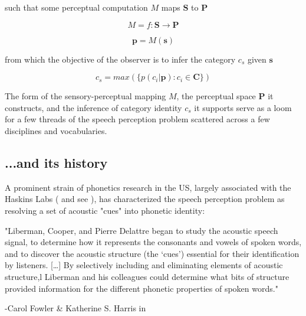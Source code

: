 \begin{multicols}{2}
such that some perceptual computation $M$ maps $\mathbf{S}$ to $\mathbf{P}$

\begin{equation}
\label{eqn:map}
M = f: \mathbf{S} \to \mathbf{P}
\end{equation} 

\begin{equation}
\label{eqn:pfroms}
\mathbf{p} = M(\mathbf{s})
\end{equation}

from which the objective of the observer is to infer the category $c_s$ given $\mathbf{s}$ 

\begin{equation}
\label{eqn:infer}
c_s = max( \{ p(c_i | \mathbf{p}) : c_i \in \mathbf{C} \})
\end{equation}

The form of the sensory-perceptual mapping $M$, the perceptual space $\mathbf{P}$ it constructs, and the inference of category identity $c_s$ it supports serve as a loom for a few threads of the speech perception problem scattered across a few disciplines and vocabularies.

\subsection{...and its history}


A prominent strain of phonetics research in the US, largely associated with the Haskins Labs (\cite{schertzPhoneticCueWeighting2020} and see \cite[p.~51]{ohalaGuideHistoryPhonetic1999}), has characterized the speech perception problem as resolving a set of acoustic "cues" into phonetic identity:

\begin{leftbar}
"Liberman, Cooper, and Pierre Delattre began to study the acoustic speech signal, to determine how it represents the consonants and vowels of spoken words, and to discover the acoustic structure (the `cues') essential for their identification by listeners. [\dots] By selectively including and eliminating elements of acoustic structure,l Liberman and his colleagues could determine what bits of structure provided information for the different phonetic properties of spoken words."

-Carol Fowler \& Katherine S. Harris in \cite[p.~51]{ohalaGuideHistoryPhonetic1999}
\end{leftbar}


\end{multicols}
